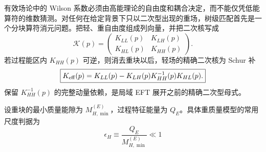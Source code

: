 有效场论中的 Wilson 系数必须由高能理论的自由度和耦合决定，而不能仅凭低能算符的维数猜测。对任何在给定背景下只以二次型出现的重场，树级匹配首先是一个分块算符消元问题。把轻、重自由度组成列向量，并把二次核写成
\begin{equation*}
 \mathcal K(p)=
 \begin{pmatrix}
  K_{LL}(p)&K_{LH}(p)\\
  K_{HL}(p)&K_{HH}(p)
 \end{pmatrix}.
\end{equation*}
若过程能区内 $K_{HH}(p)$ 可逆，则消去重块以后，轻场的精确二次核为 Schur 补
\begin{equation}
 \boxed{
 K_{\rm eff}(p)
 =K_{LL}(p)-K_{LH}(p)K_{HH}^{-1}(p)K_{HL}(p).}
 \label{eq:sm-heavy-block-schur-matching-dp85}
\end{equation}
 保留 $K_{HH}^{-1}(p)$ 的完整动量依赖，是局域 EFT 展开之前的精确二次型母式。

设重块的最小质量能隙为 $M_{H,\min}^{(E)}$，过程特征能量为 $Q_E$。具体重质量模型的常用尺度判据为
\begin{equation}
 \boxed{
 \epsilon_H\equiv\frac{Q_E}{M_{H,\min}^{(E)}}\ll1}
 \label{eq:sm-heavy-field-local-control-dp85}
\end{equation}

